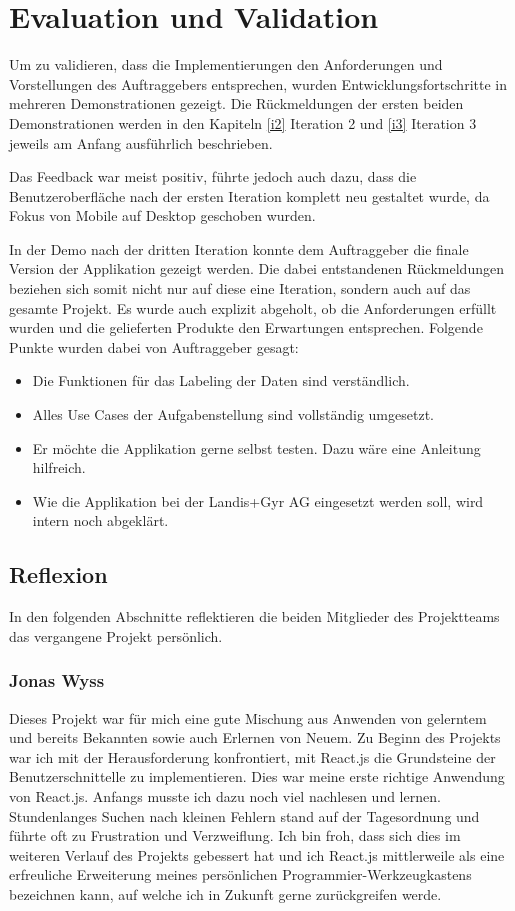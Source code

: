 \chapter{Evaluation und Validation}
Um zu validieren, dass die Implementierungen den Anforderungen und Vorstellungen des Auftraggebers entsprechen,
wurden Entwicklungsfortschritte in mehreren Demonstrationen gezeigt.
Die Rückmeldungen der ersten beiden Demonstrationen werden
in den Kapiteln \ref{i2} Iteration 2 und \ref{i3} Iteration 3 jeweils am Anfang ausführlich beschrieben.

Das Feedback war meist positiv, führte jedoch auch dazu, dass die Benutzeroberfläche nach der ersten Iteration
komplett neu gestaltet wurde, da Fokus von Mobile auf Desktop geschoben wurden.


In der Demo nach der dritten Iteration konnte dem Auftraggeber die finale Version der Applikation gezeigt werden.
Die dabei entstandenen Rückmeldungen beziehen sich somit nicht nur auf diese eine Iteration, sondern auch auf das gesamte Projekt.
Es wurde auch explizit abgeholt, ob die Anforderungen erfüllt wurden und die gelieferten Produkte den Erwartungen entsprechen.
Folgende Punkte wurden dabei von Auftraggeber gesagt:
\begin{itemize}
    \item Die Funktionen für das Labeling der Daten sind verständlich.
    \item Alles Use Cases der Aufgabenstellung sind vollständig umgesetzt.
    \item Er möchte die Applikation gerne selbst testen. Dazu wäre eine Anleitung hilfreich.
    \item Wie die Applikation bei der Landis+Gyr AG eingesetzt werden soll, wird intern noch abgeklärt.
\end{itemize}


\section{Reflexion}
In den folgenden Abschnitte reflektieren die beiden Mitglieder des Projektteams das vergangene Projekt persönlich.
\subsection{Jonas Wyss}
Dieses Projekt war für mich eine gute Mischung aus Anwenden von gelerntem und bereits Bekannten
sowie auch Erlernen von Neuem.
Zu Beginn des Projekts war ich mit der Herausforderung konfrontiert, mit React.js die Grundsteine der
Benutzerschnittelle zu implementieren. Dies war meine erste richtige Anwendung von React.js.
Anfangs musste ich dazu noch viel nachlesen und lernen.
Stundenlanges Suchen nach kleinen Fehlern stand auf der Tagesordnung und führte oft zu Frustration und Verzweiflung.
Ich bin froh, dass sich dies im weiteren Verlauf des Projekts gebessert hat und ich React.js mittlerweile als
eine erfreuliche Erweiterung meines persönlichen Programmier-Werkzeugkastens bezeichnen kann,
auf welche ich in Zukunft gerne zurückgreifen werde.

